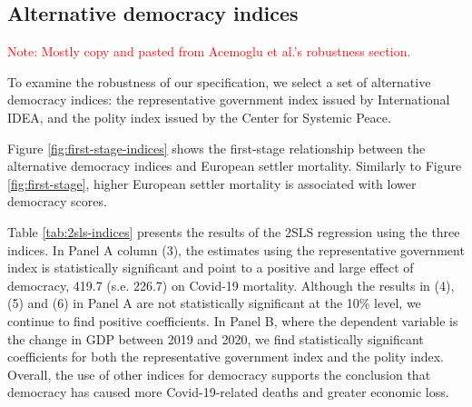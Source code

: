 
\subsection{Alternative democracy indices}

\textcolor{red}{Note: Mostly copy and pasted from Acemoglu et al.'s robustness section.}


To examine the robustness of our specification, we select a set of alternative democracy indices: the representative government index issued by International IDEA, and the polity index issued by the Center for Systemic Peace. 

Figure \ref{fig:first-stage-indices} shows the first-stage relationship between the alternative democracy indices and European settler mortality. Similarly to Figure \ref{fig:first-stage}, higher European settler mortality is associated with lower democracy scores. 
    
Table \ref{tab:2sls-indices} presents the results of the 2SLS regression using the three indices. In Panel A column (3), the estimates using the representative government index is statistically significant and point to a positive and large effect of democracy, 419.7 (s.e. 226.7) on Covid-19 mortality. Although the results in (4), (5) and (6) in Panel A are not statistically significant at the 10\% level, we continue to find positive coefficients. In Panel B, where the dependent variable is the change in GDP between 2019 and 2020, we find statistically significant coefficients for both the representative government index and the polity index. Overall, the use of other indices for democracy supports the conclusion that democracy has caused more Covid-19-related deaths and greater economic loss. 
